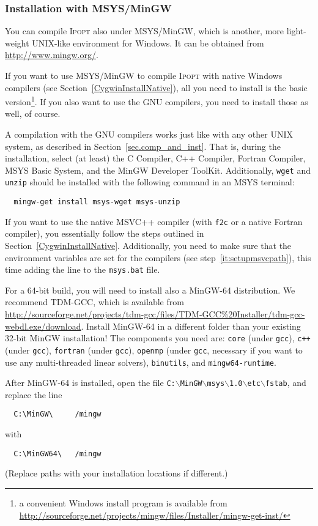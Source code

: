 \documentclass[10pt]{article}
\newcommand{\Ipopt}{\textsc{Ipopt}\xspace}
\begin{document}
\subsubsection{Installation with MSYS/MinGW}\label{MinGWInstall}

You can compile \Ipopt also under MSYS/MinGW, which is another, more
light-weight UNIX-like environment for Windows.  It can be obtained
from \url{http://www.mingw.org/}.

If you want to use MSYS/MinGW to compile \Ipopt with native Windows
compilers (see Section~\ref{CygwinInstallNative}), all you need to
install is the basic version\footnote{a convenient Windows install
program is available from \url{http://sourceforge.net/projects/mingw/files/Installer/mingw-get-inst/}}.
If you also want to use the GNU
compilers, you need to install those as well, of course.

A compilation with the GNU compilers works just like with any other
UNIX system, as described in Section~\ref{sec.comp_and_inst}.
That is, during the installation, select (at least) the C Compiler, C++ Compiler, Fortran Compiler, MSYS Basic System, and the MinGW Developer ToolKit. 
Additionally, {\tt wget} and {\tt unzip} should be installed with the following command in an MSYS terminal:
\begin{verbatim}
  mingw-get install msys-wget msys-unzip
\end{verbatim}

If you want to use the native MSVC++ compiler (with {\tt f2c} or a native
Fortran compiler), you essentially follow the steps outlined in
Section~\ref{CygwinInstallNative}. 
Additionally, you need to make sure that the environment variables are set for 
the compilers (see step~\ref{it:setupmsvcpath}), this time adding the line to 
the {\tt msys.bat} file.

For a 64-bit build, you will need to install also a MinGW-64 distribution.
We recommend TDM-GCC, which is available from \url{http://sourceforge.net/projects/tdm-gcc/files/TDM-GCC\%20Installer/tdm-gcc-webdl.exe/download}.
Install MinGW-64 in a different folder than your existing 32-bit MinGW installation!
The components you need are: {\tt core} (under {\tt gcc}), {\tt c++} (under {\tt gcc}), {\tt fortran} (under {\tt gcc}), {\tt openmp} (under {\tt gcc}, necessary if you want to use any multi-threaded linear solvers), {\tt binutils}, and {\tt mingw64-runtime}.

After MinGW-64 is installed, open the file {\tt C:$\backslash$MinGW$\backslash$msys$\backslash$1.0$\backslash$etc$\backslash$fstab}, and replace the line
\begin{verbatim}
  C:\MinGW\     /mingw
\end{verbatim}
with
\begin{verbatim}
  C:\MinGW64\   /mingw
\end{verbatim}
(Replace paths with your installation locations if different.) 
\end{document}
